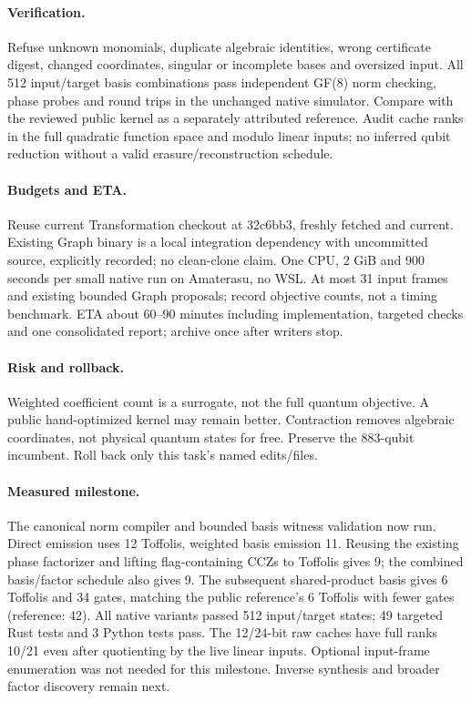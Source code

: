 \documentclass{article}
\begin{document}
\paragraph{Verification.} Refuse unknown monomials, duplicate algebraic identities,
wrong certificate digest, changed coordinates, singular or incomplete bases and
oversized input. All 512 input/target basis combinations pass independent GF(8)
norm checking, phase probes and round trips in the unchanged native simulator.
Compare with the reviewed public kernel as a separately attributed reference.
Audit cache ranks in the full quadratic function space and modulo linear inputs;
no inferred qubit reduction without a valid erasure/reconstruction schedule.
\paragraph{Budgets and ETA.} Reuse current Transformation checkout at 32c6bb3,
freshly fetched and current. Existing Graph binary is a local integration dependency
with uncommitted source, explicitly recorded; no clean-clone claim. One CPU,
2 GiB and 900 seconds per small native run on Amaterasu, no WSL. At most 31
input frames and existing bounded Graph proposals; record objective counts, not a
timing benchmark. ETA about 60--90 minutes including implementation, targeted
checks and one consolidated report; archive once after writers stop.
\paragraph{Risk and rollback.} Weighted coefficient count is a surrogate, not
the full quantum objective. A public hand-optimized kernel may remain better.
Contraction removes algebraic coordinates, not physical quantum states for free.
Preserve the 883-qubit incumbent. Roll back only this task's named edits/files.
\paragraph{Measured milestone.} The canonical norm compiler and bounded basis
witness validation now run. Direct emission uses 12 Toffolis, weighted basis
emission 11. Reusing the existing phase factorizer and lifting flag-containing
CCZs to Toffolis gives 9; the combined basis/factor schedule also gives 9.
The subsequent shared-product basis gives 6 Toffolis and 34 gates, matching
the public reference's 6 Toffolis with fewer gates (reference: 42). All native
variants passed 512 input/target states; 49 targeted Rust tests and 3 Python
tests pass. The 12/24-bit raw caches have full ranks 10/21 even after quotienting
by the live linear inputs. Optional input-frame enumeration was not needed for
this milestone. Inverse synthesis and broader factor discovery remain next.
\end{document}
